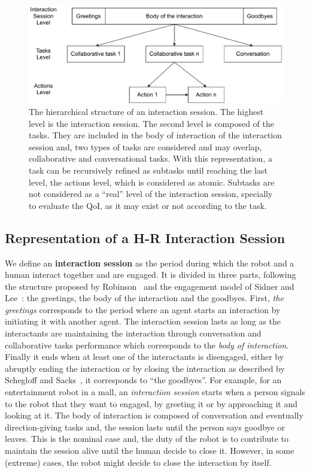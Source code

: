 \documentclass[a4paper,11pt,twoside]{StyleThese}
\begin{document}
\begin{figure}[!ht]
	\centering
	\includegraphics[width=\linewidth]{figures/chapter2/session_interaction.pdf}
	\caption{The hierarchical structure of an interaction session. The highest level is the interaction session. The second level is composed of the tasks. They are included in the body of interaction of the interaction session and, two types of tasks are considered and may overlap, collaborative and conversational tasks. With this representation, a task can be recursively refined as subtasks until reaching the last level, the actions level, which is considered as atomic. Subtasks are not considered as a ``real'' level of the interaction session, specially to evaluate the QoI, as it may exist or not according to the task.
	}
	\label{fig:levels}
\end{figure}


\subsection{Representation of a H-R Interaction Session}
We define an \textbf{interaction session} as the period during which the robot and a human interact together and are engaged. It is divided in three parts, following the structure proposed by Robinson~\cite{robinson_overall_2012} and the engagement model of Sidner and Lee~\cite{sidner_2003_engagement}: the greetings, the body of the interaction and the goodbyes. First, \textit{the greetings} corresponds to the period where an agent starts an interaction by initiating it with another agent. The interaction session lasts as long as the interactants are maintaining the interaction through conversation and collaborative tasks performance which corresponds to the \textit{body of interaction}. Finally it ends when at least one of the interactants is disengaged, either by abruptly ending the interaction or by closing the interaction as described by Schegloff and Sacks~\cite{schegloff_1973_opening}, it corresponds to ``the goodbyes''. For example, for an entertainment robot in a mall, an \textit{interaction session} starts when a person signals to the robot that they want to engaged, by greeting it or by approaching it and looking at it. The body of interaction is composed of conversation and eventually direction-giving tasks and, the session lasts until the person says goodbye or leaves. This is the nominal case and, the duty of the robot is to contribute to maintain the session alive until the human decide to close it. However, in some (extreme) cases, the robot might decide to close the interaction by itself.
\end{document}
